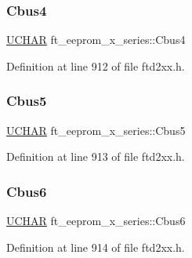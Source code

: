 \subsubsection{\texorpdfstring{Cbus4}{Cbus4}}
{\footnotesize\ttfamily \hyperlink{CatCaloProto40MHz_2inc_2WinTypes_8h_a4f4bb67531a9bf6f0b9c6ad76aeba587}{U\+C\+H\+AR} ft\+\_\+eeprom\+\_\+x\+\_\+series\+::\+Cbus4}



Definition at line 912 of file ftd2xx.\+h.

\mbox{\label{structft__eeprom__x__series_a229d87354476bde9baf6a4f9973c607b}} 
\subsubsection{\texorpdfstring{Cbus5}{Cbus5}}
{\footnotesize\ttfamily \hyperlink{CatCaloProto40MHz_2inc_2WinTypes_8h_a4f4bb67531a9bf6f0b9c6ad76aeba587}{U\+C\+H\+AR} ft\+\_\+eeprom\+\_\+x\+\_\+series\+::\+Cbus5}



Definition at line 913 of file ftd2xx.\+h.

\mbox{\label{structft__eeprom__x__series_a464c671013e8ffbcb5cd41775b1871a5}} 
\subsubsection{\texorpdfstring{Cbus6}{Cbus6}}
{\footnotesize\ttfamily \hyperlink{CatCaloProto40MHz_2inc_2WinTypes_8h_a4f4bb67531a9bf6f0b9c6ad76aeba587}{U\+C\+H\+AR} ft\+\_\+eeprom\+\_\+x\+\_\+series\+::\+Cbus6}



Definition at line 914 of file ftd2xx.\+h.

\mbox{\label{structft__eeprom__x__series_a4d1ac63e7dc2e8e677edcc43b566dc01}} 
